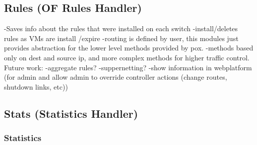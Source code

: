 \documentclass[12pt,english,oneside]{book}
\begin{document}
\subsection{Rules (OF Rules Handler)}
\hspace{0.6cm}

-Saves info about the rules that were installed on each switch
-install/deletes rules as VMs are install /expire
-routing is defined by user, this modules just provides abstraction for the lower level methods provided by pox.
-methods based only on dest and source ip, and more complex methods for higher traffic control.
Future work:
-aggregate rules?
-suppernetting?
-show information in webplatform (for admin and allow admin to override controller actions (change routes, shutdown links, etc))

\subsection{Stats (Statistics Handler)}

\subsubsection{Statistics}
\hspace{0.6cm}
\end{document}
